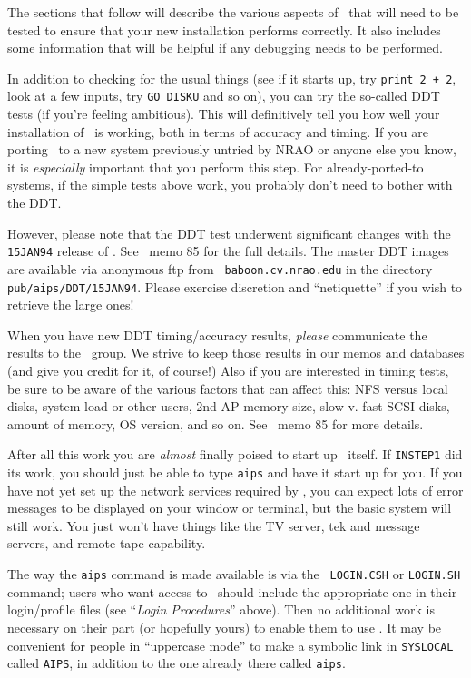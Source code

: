 The sections that follow will describe the various aspects of
\AIPS\ that will need to be tested to ensure that your new installation
performs correctly.  It also includes some information that will be
helpful if any debugging needs to be performed.

In addition to checking for the usual things (see if it starts up, try
{\tt print 2 + 2}, look at a few inputs, try {\tt GO DISKU} and so on),
you can try the so-called DDT tests (if you're feeling ambitious).  This
will definitively tell you how well your installation of \AIPS\ is
working, both in terms of accuracy and timing.  If you are porting
\AIPS\ to a new system previously untried by NRAO or anyone else you
know, it is {\it especially} important that you perform this step.  For
already-ported-to systems, if the simple tests above work, you probably
don't need to bother with the DDT.

However, please note that the DDT test underwent significant changes with
the {\tt 15JAN94} release of \AIPS.  See \AIPS\ memo 85 for the full
details.  The master DDT images are available via anonymous ftp from {\tt
baboon.cv.nrao.edu} in the directory {\tt pub/aips/DDT/15JAN94}.  Please
exercise discretion and ``netiquette'' if you wish to retrieve the large
ones!

When you have new DDT timing/accuracy results, {\it please\/}
communicate the results to the \AIPS\ group.  We strive to keep those
results in our memos and databases (and give you credit for it, of
course!)  Also if you are interested in timing tests, be sure to be
aware of the various factors that can affect this: NFS versus local
disks, system load or other users, 2nd AP memory size, slow v. fast
SCSI disks, amount of memory, OS version, and so on.  See \AIPS\ memo 85
for more details.

\medskip{}

After all this work you are {\it almost} finally poised to start up
\AIPS\ itself.  If {\tt INSTEP1} did its work, you should just be able
to type {\tt aips} and have it start up for you.  If you have not yet
set up the network services required by \AIPS, you can expect lots of
error messages to be displayed on your window or terminal, but the
basic system will still work.  You just won't have things like the TV
server, tek and message servers, and remote tape capability.

The way the {\tt aips} command is made available is via the {\tt
LOGIN.CSH} or {\tt LOGIN.SH} command; users who want access to
\ttaips\ should include the appropriate one in their login/profile files
(see ``{\it Login Procedures}'' above).  Then no additional work is
necessary on their part (or hopefully yours) to enable them to use
\AIPS.  It may be convenient for people in ``uppercase mode'' to make a
symbolic link in {\tt\dol SYSLOCAL} called {\tt AIPS}, in addition to the
one already there called {\tt aips}.

